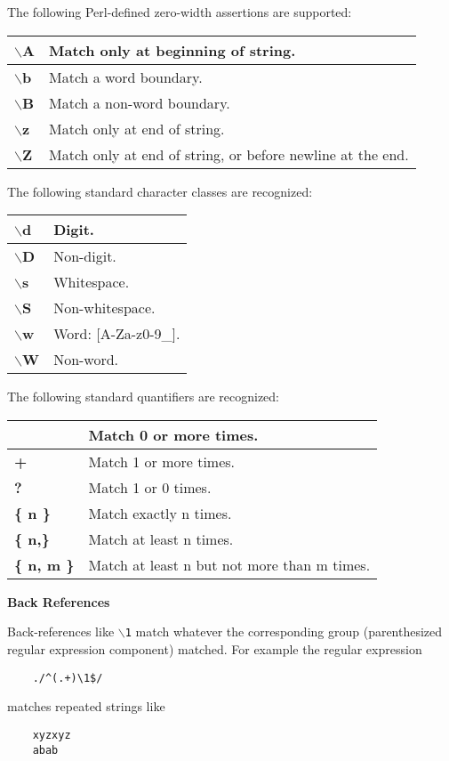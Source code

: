 The following Perl-defined zero-width assertions are supported: 

\begin{tabular}{|l|l|} \hline
{\bf $\backslash$A } &  Match only at beginning of string.  \\ \hline
{\bf $\backslash$b } & Match a word boundary.  \\ \hline
{\bf $\backslash$B } &  Match a non-word boundary.  \\ \hline
{\bf $\backslash$z } &  Match only at end of string.  \\ \hline
{\bf $\backslash$Z } &  Match only at end of string, or before newline at the end.  \\ \hline
\end{tabular}

The following standard character classes are recognized: 

\begin{tabular}{|l|l|} \hline
{\bf $\backslash$d} &  Digit. \\ \hline
{\bf $\backslash$D} &  Non-digit. \\ \hline
{\bf $\backslash$s} &  Whitespace. \\ \hline
{\bf $\backslash$S} &  Non-whitespace. \\ \hline
{\bf $\backslash$w} &  Word: [A-Za-z0-9\_]. \\ \hline
{\bf $\backslash$W} &  Non-word. \\ \hline
\end{tabular}

The following standard quantifiers are recognized: 

\begin{tabular}{|l|l|} \hline
{\bf *}  &  Match 0 or more times. \\ \hline
{\bf +} &    Match 1 or more times.  \\ \hline
{\bf ?}  &   Match 1 or 0 times.  \\ \hline
{\bf \{ n \}} &  Match exactly n times.  \\ \hline
{\bf \{ n,\}} &  Match at least n times.  \\ \hline
{\bf \{ n, m \}} & Match at least n but not more than m times.  \\ \hline
\end{tabular}

{\bf Back References}

Back-references like {\tt $\backslash$1} match whatever the corresponding group (parenthesized 
regular expression component) matched.  For example the regular expression 
\begin{verbatim} 
    ./^(.+)\1$/
\end{verbatim} 
matches repeated strings like 
\begin{verbatim} 
    xyzxyz
    abab
\end{verbatim} 

